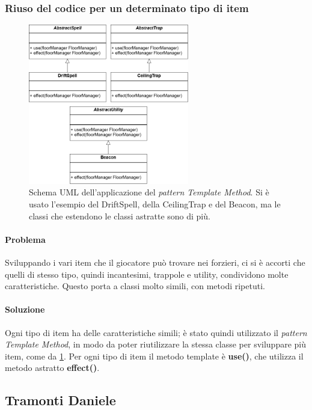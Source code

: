 \documentclass{report}
\begin{document}
\subsubsection{Riuso del codice per un determinato tipo di item}

\begin{figure}
    \centering
    \includegraphics[width=7cm]{patternTemplateItem.drawio.png}
    \caption{Schema UML dell'applicazione del \textit{pattern Template Method}. Si è usato l'esempio del DriftSpell, della CeilingTrap e del Beacon, ma le classi che estendono le classi astratte sono di più.}
    \label{img:templateItem}
\end{figure}

\paragraph{Problema} Sviluppando i vari item che il giocatore può trovare nei forzieri, ci si è accorti che quelli di stesso tipo, quindi incantesimi, trappole e utility, condividono molte caratteristiche.
%
Questo porta a classi molto simili, con metodi ripetuti. 

\paragraph{Soluzione} Ogni tipo di item ha delle caratteristiche simili; è stato quindi utilizzato il \textit{pattern Template Method}, in modo da poter riutilizzare la stessa classe per sviluppare più item, come da \ref{img:templateItem}.
%
Per ogni tipo di item il metodo template è \textbf{use()}, che utilizza il metodo astratto \textbf{effect()}. 

\subsection{Tramonti Daniele}
\end{document}
